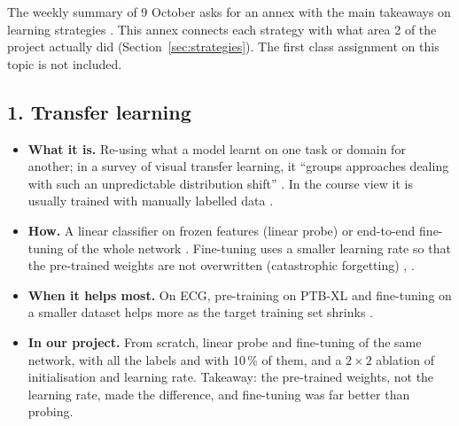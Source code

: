 \label{app:strategies}

The weekly summary of 9 October asks for an annex with the main takeaways on learning strategies
\cite{course_summary_0910}. This annex connects each strategy with what area 2 of the project actually
did (Section~\ref{sec:strategies}). The first class assignment on this topic is not included.

\subsection*{1. Transfer learning}
\begin{itemize}[leftmargin=1.2em,itemsep=1pt]
  \item \textbf{What it is.} Re-using what a model learnt on one task or domain for another; in a
        survey of visual transfer learning, it ``groups approaches dealing with such an unpredictable
        distribution shift'' \cite[p.~2]{monka2022survey}. In the course view it is usually trained with
        manually labelled data \cite{course_summary_0910}.
  \item \textbf{How.} A linear classifier on frozen features (linear probe) or end-to-end fine-tuning
        of the whole network \cite[p.~11]{radford2021learning}. Fine-tuning uses a smaller learning rate
        so that the pre-trained weights are not overwritten (catastrophic forgetting)
        \cite[p.~6]{soltanieh2023indistribution}, \cite[p.~1521]{strodthoff2021deep}.
  \item \textbf{When it helps most.} On ECG, pre-training on PTB-XL and fine-tuning on a smaller dataset
        helps more as the target training set shrinks \cite[p.~1524]{strodthoff2021deep}.
  \item \textbf{In our project.} From scratch, linear probe and fine-tuning of the same network, with all
        the labels and with 10\,\% of them, and a $2\times2$ ablation of initialisation and learning rate.
        Takeaway: the pre-trained weights, not the learning rate, made the difference, and fine-tuning was
        far better than probing.
\end{itemize}

